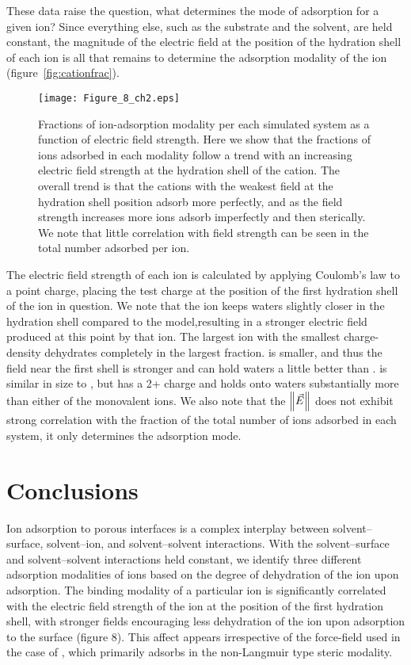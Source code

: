 These data raise the question, what determines the mode of adsorption for a given ion? Since everything else, such as
the substrate and the solvent, are held constant, the magnitude of the electric field at the position of the hydration shell
of each ion is all that remains to determine the adsorption modality of the ion (figure~\ref{fig:cationfrac}).
\begin{figure}
    \caption[Ion adsorption modalities]{Fractions of ion-adsorption modality per each simulated system as a function of electric field strength. Here we 
    show that the fractions of ions adsorbed in each modality follow a trend with an increasing electric field strength at the
    hydration shell of the cation. The overall trend is that the cations with the weakest field at the hydration shell position
    adsorb more perfectly, and as the field strength increases more ions adsorb imperfectly and then sterically. We note
    that little correlation with field strength can be seen in the total number adsorbed per ion.}
    \label{fig:cationfrac:ch2}
    \texttt{[image: Figure\_8\_ch2.eps]}
\end{figure}
The electric field strength of each ion is calculated by applying Coulomb's law to a point charge, placing the test charge at the 
position of the first hydration shell of the ion in question. We note that the \mgmbnbfix ion keeps waters slightly closer in the hydration shell
compared to the \mgmicro model{,}{resulting in} a stronger electric field 
produced at this point by that ion.
The largest ion with the smallest charge-density \na dehydrates completely in the largest fraction. \li is smaller, and thus the field near
the first shell is stronger and can hold waters a little better than \na. \mg is similar in size to \li, but has a 2+ charge and
holds onto waters substantially more than either of the monovalent ions.  
We also note that the $\left\lVert\vec{E}\right\rVert$ does not exhibit strong correlation with the fraction of the total number of ions adsorbed in each system, it
only determines the adsorption mode. 

\section{Conclusions}
Ion adsorption to porous interfaces is a complex interplay 
between solvent--surface, solvent--ion, and solvent--solvent
interactions. With the solvent--surface and solvent--solvent interactions 
held constant, we identify
three different adsorption modalities of ions based on the degree of 
dehydration of the ion upon adsorption. 
The binding modality of a particular ion is significantly correlated 
with the electric field strength of the ion
at the position of the first hydration shell, with stronger fields 
encouraging less dehydration of the ion upon
adsorption to the surface {(figure 8)}. This affect appears irrespective of the force-field 
used in the case
of \mg, which primarily adsorbs in the non-Langmuir type steric modality.


